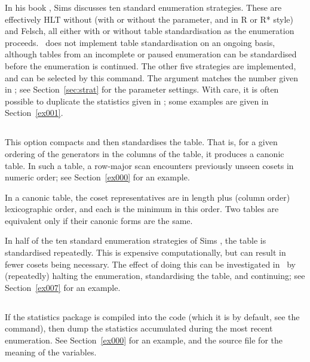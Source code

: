 In his book \cite{Sim94}, Sims discusses ten standard enumeration
  strategies.
These are effectively HLT without  (with or without the 
   parameter, and in R or R* style) and Felsch, all either with
  or without table standardisation as the enumeration proceeds.
\ace\ does not implement table standardisation on an ongoing basis, 
  although tables from an incomplete or paused enumeration can be 
  standardised before the enumeration is continued.
The other five strategies are implemented, and can be selected by this
  command.
The argument matches the number given in \cite[\S5.5]{Sim94}; see
  Section~\ref{sec:strat} for the parameter settings.
With care, it is often possible to duplicate the statistics given in 
  \cite{Sim94}; some examples are given in Section~\ref{ex001}.

\subsection{}

This option compacts and then standardises the table.
That is, for a given ordering of the generators in the columns of the
  table, it produces a canonic table.
In such a table, a row-major scan encounters previously unseen cosets in
  numeric order; see Section~\ref{ex000} for an example.

In a canonic table, the coset representatives are in length plus (column
  order) lexicographic order, and each is the minimum in this order.
Two tables are equivalent only if their canonic forms are the same.

In half of the ten standard enumeration strategies of Sims \cite{Sim94}, the
  table is standardised repeatedly.
This is expensive computationally, but can result in fewer cosets being
  necessary.
The effect of doing this can be investigated in \ace\ by (repeatedly)
  halting the enumeration, standardising the table, and continuing; see 
  Section~\ref{ex007} for an example.

\subsection{}

If the statistics package is compiled into the code (which it is by
  default, see the  command), then dump the statistics
  accumulated during the most recent enumeration.
See Section~\ref{ex000} for an example, and the  source file
  for the meaning of the variables.

